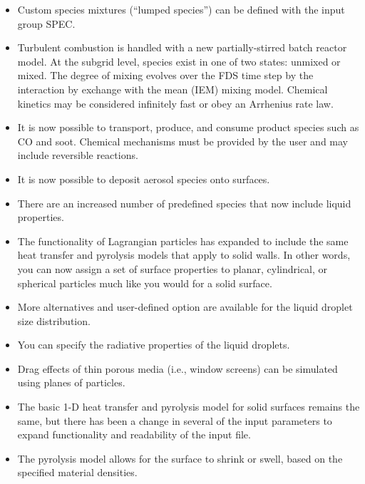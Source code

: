 \documentclass[11pt]{book}
\begin{document}

    \begin{itemize}
    \item Custom species mixtures (``lumped species'') can be defined with the input group SPEC.
    \item Turbulent combustion is handled with a new partially-stirred batch reactor model. At the subgrid level, species exist in one of two states: unmixed or mixed. The degree of mixing evolves over the FDS time step by the interaction by exchange with the mean (IEM) mixing model. Chemical kinetics may be considered infinitely fast or obey an Arrhenius rate law.
    \item It is now possible to transport, produce, and consume product species such as CO and soot. Chemical mechanisms must be provided by the user and may include reversible reactions.
    \item It is now possible to deposit aerosol species onto surfaces.
    \item There are an increased number of predefined species that now include liquid properties.
    \end{itemize}


    \begin{itemize}
    \item The functionality of Lagrangian particles has expanded to include the same heat transfer and pyrolysis models that apply to solid walls. In other words, you can now assign a set of surface properties to planar, cylindrical, or spherical particles much like you would for a solid surface.
    \item More alternatives and user-defined option are available for the liquid droplet size distribution.
    \item You can specify the radiative properties of the liquid droplets.
    \item Drag effects of thin porous media (i.e., window screens) can be simulated using planes of particles.
    \end{itemize}


    \begin{itemize}
    \item The basic 1-D heat transfer and pyrolysis model for solid surfaces remains the same, but there has been a change in several of the input parameters to expand functionality and readability of the input file.
    \item The pyrolysis model allows for the surface to shrink or swell, based on the specified material densities.
    \end{itemize}
\end{document}

